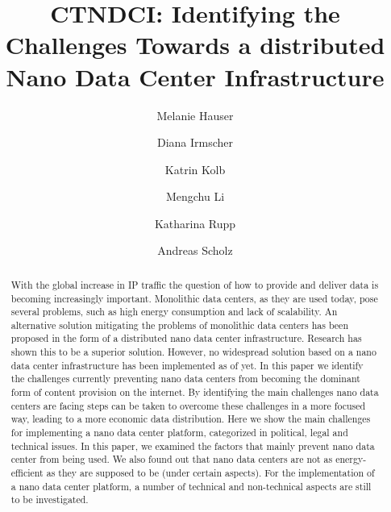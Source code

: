 \documentclass[review=true, screen, acmlarge]{acmart}
\begin{document}
\title{CTNDCI: Identifying the Challenges Towards a distributed Nano Data Center Infrastructure} 

\author{Melanie Hauser}

\author{Diana Irmscher}

\author{Katrin Kolb}

\author{Mengchu Li} 

\author{Katharina Rupp}

\author{Andreas Scholz}




\begin{abstract}
With the global increase in IP traffic the question of how to provide and deliver data is becoming increasingly important. Monolithic data centers, as they are used today, pose several problems, such as high energy consumption and lack of scalability.
An alternative solution mitigating the problems of monolithic data centers has been proposed in the form of a distributed nano data center infrastructure. Research has shown this to be a superior solution. 
However, no widespread solution based on a nano data center infrastructure has been implemented as of yet. In this paper we identify the challenges currently preventing nano data centers from becoming the dominant form of content provision on the internet.
By identifying the main challenges nano data centers are facing steps can be taken to overcome these challenges in a more focused way, leading to a more economic data distribution.
Here we show the main challenges for implementing a nano data center platform, categorized in political, legal and technical issues.
In this paper, we examined the factors that mainly prevent nano data center from being used. We also found out that nano data centers are not as energy-efficient as they are supposed to be (under certain aspects).
For the implementation of a nano data center platform, a number of technical and non-technical aspects are still to be investigated.




\end{abstract}



\maketitle


\end{document}
